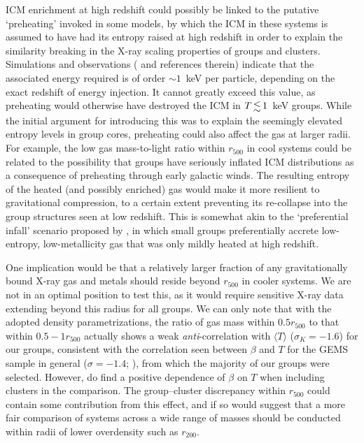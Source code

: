 \documentclass[useAMS,usenatbib]{mn2e}
\begin{document}
ICM enrichment at high redshift could possibly be linked to the
putative `preheating' invoked in some models, by which the ICM in
these systems is assumed to have had its entropy raised at high
redshift in order to explain the similarity breaking in the X-ray
scaling properties of groups and clusters.  Simulations and
observations (\citealt{borg08a} and references therein) indicate that
the associated energy required is of order $\sim 1$~keV per particle,
depending on the exact redshift of energy injection. It cannot greatly
exceed this value, as preheating would otherwise have destroyed the
ICM in $T\la 1$~keV groups. While the initial argument for introducing
this was to explain the seemingly elevated entropy levels in group
cores, preheating could also affect the gas at larger radii. For
example, the low gas mass-to-light ratio within $r_{500}$ in cool
systems could be related to the possibility that groups have seriously
inflated ICM distributions as a consequence of preheating through
early galactic winds. The resulting entropy of the heated (and
possibly enriched) gas would make it more resilient to gravitational
compression, to a certain extent preventing its re-collapse into the
group structures seen at low redshift. This is somewhat akin to the
`preferential infall' scenario proposed by \citet{fino01}, in which
small groups preferentially accrete low-entropy, low-metallicity gas
that was only mildly heated at high redshift.

One implication would be that a relatively larger fraction of any
gravitationally bound X-ray gas and metals should reside beyond
$r_{500}$ in cooler systems. We are not in an optimal position to test
this, as it would require sensitive X-ray data extending beyond this
radius for all groups. We can only note that with the adopted density
parametrizations, the ratio of gas mass within $0.5 r_{500}$ to that
within $0.5-1r_{500}$ actually shows a weak {\em anti}-correlation
with $\langle T\rangle$ ($\sigma_K = -1.6$) for our groups, consistent
with the correlation seen between $\beta$ and $T$ for the GEMS sample
in general ($\sigma=-1.4$; \citealt{osmo04}), from which the majority
of our groups were selected.  However, \cite{sand03} do find a
positive dependence of $\beta$ on $T$ when including clusters in the
comparison. The group--cluster discrepancy within $r_{500}$ could
contain some contribution from this effect, and if so would suggest
that a more fair comparison of systems across a wide range of masses
should be conducted within radii of lower overdensity such as
$r_{200}$.
\end{document}
